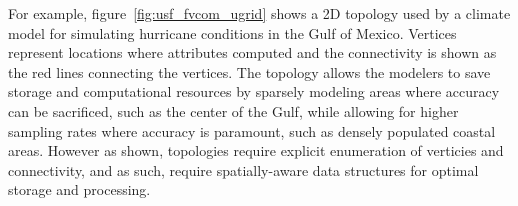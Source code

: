 
For example, figure~\ref{fig:usf_fvcom_ugrid} shows a \ugrid{} 2D
topology used by a climate model for simulating hurricane conditions
in the Gulf of Mexico. Vertices represent locations where attributes
computed and the connectivity is shown as the red lines connecting the
vertices. The \ugrid{} topology allows the modelers to save storage
and computational resources by sparsely modeling areas where accuracy
can be sacrificed, such as the center of the Gulf, while allowing for
higher sampling rates where accuracy is paramount, such as densely
populated coastal areas. However as shown, \ugrid{} topologies require
explicit enumeration of verticies and connectivity, and as such,
require spatially-aware data structures for optimal storage and
processing.

